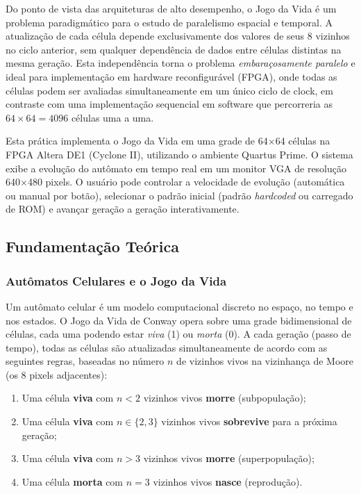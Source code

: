 \documentclass[12pt, a4paper]{article}
\begin{document}
	Do ponto de vista das arquiteturas de alto desempenho, o Jogo da Vida é um
	problema paradigmático para o estudo de paralelismo espacial e temporal. A
	atualização de cada célula depende exclusivamente dos valores de seus 8 vizinhos
	no ciclo anterior, sem qualquer dependência de dados entre células distintas na
	mesma geração. Esta independência torna o problema \textit{embaraçosamente
		paralelo} e ideal para implementação em hardware reconfigurável (FPGA), onde
	todas as células podem ser avaliadas simultaneamente em um único ciclo de clock,
	em contraste com uma implementação sequencial em software que percorreria as
	$64 \times 64 = 4096$ células uma a uma.
	
	Esta prática implementa o Jogo da Vida em uma grade de 64$\times$64 células
	na FPGA Altera DE1 (Cyclone II), utilizando o ambiente Quartus Prime. O sistema
	exibe a evolução do autômato em tempo real em um monitor VGA de resolução
	640$\times$480 pixels. O usuário pode controlar a velocidade de evolução
	(automática ou manual por botão), selecionar o padrão inicial (padrão
	\textit{hardcoded} ou carregado de ROM) e avançar geração a geração
	interativamente.
	
	\subsection{Fundamentação Teórica}
	
	\subsubsection{Autômatos Celulares e o Jogo da Vida}
	
	Um autômato celular é um modelo computacional discreto no espaço, no tempo e
	nos estados. O Jogo da Vida de Conway opera sobre uma grade bidimensional de
	células, cada uma podendo estar \textit{viva} (1) ou \textit{morta} (0). A cada
	geração (passo de tempo), todas as células são atualizadas simultaneamente de
	acordo com as seguintes regras, baseadas no número $n$ de vizinhos vivos na
	vizinhança de Moore (os 8 pixels adjacentes):
	
	\begin{enumerate}
		\item Uma célula \textbf{viva} com $n < 2$ vizinhos vivos \textbf{morre}
		(subpopulação);
		\item Uma célula \textbf{viva} com $n \in \{2, 3\}$ vizinhos vivos
		\textbf{sobrevive} para a próxima geração;
		\item Uma célula \textbf{viva} com $n > 3$ vizinhos vivos \textbf{morre}
		(superpopulação);
		\item Uma célula \textbf{morta} com $n = 3$ vizinhos vivos \textbf{nasce}
		(reprodução).
	\end{enumerate}
	
\end{document}

